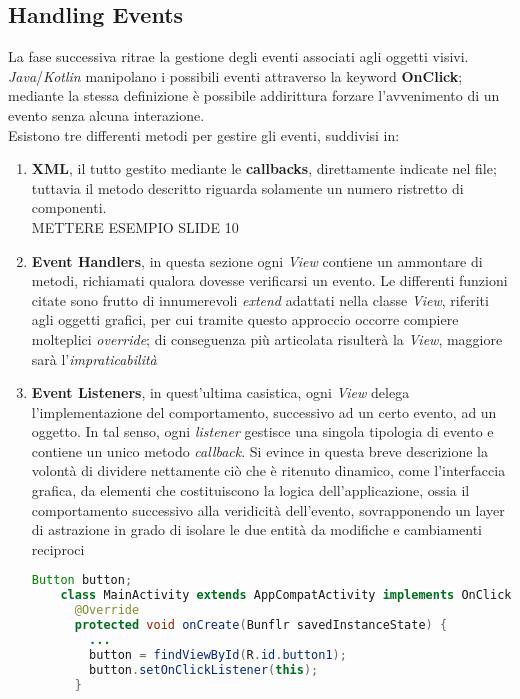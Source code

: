 \documentclass{article}
\begin{document}
\subsection*{Handling Events}
La fase successiva ritrae la gestione degli eventi associati agli oggetti visivi. \textit{Java}/\textit{Kotlin} manipolano i possibili eventi attraverso la keyword \textbf{OnClick}; mediante la stessa definizione è possibile addirittura forzare l'avvenimento di un evento senza alcuna interazione.\vspace*{14pt}\\
Esistono tre differenti metodi per gestire gli eventi, suddivisi in:
\begin{enumerate}
  \itemsep0em
  \renewcommand{\labelenumi}{-}
  \item \textbf{XML}, il tutto gestito mediante le \textbf{callbacks}, direttamente indicate nel file; tuttavia il metodo descritto riguarda solamente un numero ristretto di componenti. \\METTERE ESEMPIO SLIDE 10
  \item \textbf{Event Handlers}, in questa sezione ogni \textit{View} contiene un ammontare di metodi, richiamati qualora dovesse verificarsi un evento. Le differenti funzioni citate sono frutto di innumerevoli \textit{extend} adattati nella classe \textit{View}, riferiti agli oggetti grafici, per cui tramite questo approccio occorre compiere molteplici \textit{override}; di conseguenza più articolata risulterà la \textit{View}, maggiore sarà l'\textit{impraticabilità}
  \item \textbf{Event Listeners}, in quest'ultima casistica, ogni \textit{View} delega l'implementazione del comportamento, successivo ad un certo evento, ad un oggetto. In tal senso, ogni \textit{listener} gestisce una singola tipologia di evento e contiene un unico metodo \textit{callback}. Si evince in questa breve descrizione la volontà di dividere nettamente ciò che è ritenuto dinamico, come l'interfaccia grafica, da elementi che costituiscono la logica dell'applicazione, ossia il comportamento successivo alla veridicità dell'evento, sovrapponendo un layer di astrazione in grado di isolare le due entità da modifiche e cambiamenti reciproci \\
  \begin{lstlisting}[language=JAVA, title=Gestione evento tramite Event Listener]
    Button button;
    class MainActivity extends AppCompatActivity implements OnClickListener{
      @Override
      protected void onCreate(Bunflr savedInstanceState) {
        ...
        button = findViewById(R.id.button1);
        button.setOnClickListener(this); 
      }


\end{lstlisting}
\end{enumerate}
\end{document}
